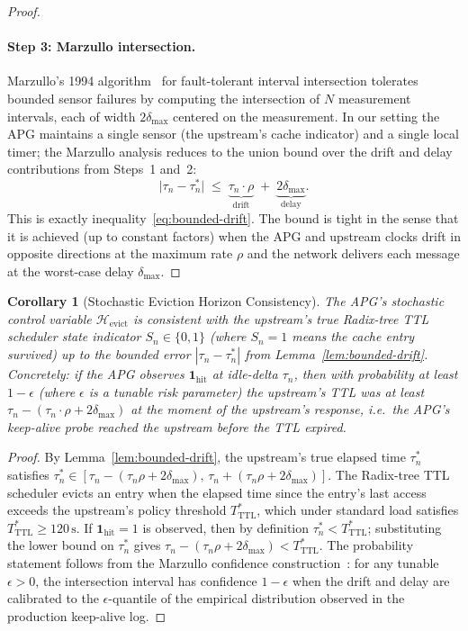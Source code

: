 \documentclass[10pt,twocolumn]{article}
\newtheorem{corollary}[theorem]{Corollary}
\theoremstyle{definition}
\theoremstyle{remark}
\begin{document}
\begin{proof}
\paragraph{Step 3: Marzullo intersection.}
Marzullo's 1994 algorithm~\citep{marzullo1994} for fault-tolerant
interval intersection tolerates bounded sensor failures by computing the
intersection of $N$ measurement intervals, each of width $2 \delta_{\max}$
centered on the measurement. In our setting the APG maintains a single
sensor (the upstream's cache indicator) and a single local timer; the
Marzullo analysis reduces to the union bound over the drift and delay
contributions from Steps~1 and~2:
\begin{equation}
\bigl| \tau_n - \tau_n^* \bigr|
\;\le\; \underbrace{\tau_n \cdot \rho}_{\text{drift}} \;+\;
\underbrace{2 \delta_{\max}}_{\text{delay}}.
\end{equation}
This is exactly inequality~\eqref{eq:bounded-drift}. The bound is
tight in the sense that it is achieved (up to constant factors) when
the APG and upstream clocks drift in opposite directions at the
maximum rate $\rho$ and the network delivers each message at the
worst-case delay $\delta_{\max}$. \qedhere
\end{proof}

\begin{corollary}[Stochastic Eviction Horizon Consistency]
\label{cor:evict-horizon-consistency}
The APG's stochastic control variable $\mathcal{H}_{\text{evict}}$ is
consistent with the upstream's true Radix-tree TTL scheduler state
indicator $S_n \in \{0, 1\}$ (where $S_n = 1$ means the cache entry
survived) up to the bounded error $|\tau_n - \tau_n^*|$ from
Lemma~\ref{lem:bounded-drift}. Concretely: if the APG observes
$\mathbf{1}_{\text{hit}}$ at idle-delta $\tau_n$, then with probability
at least $1 - \epsilon$ (where $\epsilon$ is a tunable risk parameter)
the upstream's TTL was at least
$\tau_n - (\tau_n \cdot \rho + 2 \delta_{\max})$ at the moment of the
upstream's response, i.e.\ the APG's keep-alive probe reached the
upstream before the TTL expired.
\end{corollary}

\begin{proof}
By Lemma~\ref{lem:bounded-drift}, the upstream's true elapsed time
$\tau_n^*$ satisfies
$\tau_n^* \in [\tau_n - (\tau_n \rho + 2 \delta_{\max}),\,
                \tau_n + (\tau_n \rho + 2 \delta_{\max})]$.
The Radix-tree TTL scheduler evicts an entry when the elapsed time
since the entry's last access exceeds the upstream's policy threshold
$T_{\text{TTL}}^*$, which under standard load satisfies
$T_{\text{TTL}}^* \ge 120\,\text{s}$. If $\mathbf{1}_{\text{hit}} = 1$ is
observed, then by definition $\tau_n^* < T_{\text{TTL}}^*$; substituting
the lower bound on $\tau_n^*$ gives
$\tau_n - (\tau_n \rho + 2 \delta_{\max}) < T_{\text{TTL}}^*$. The
probability statement follows from the Marzullo confidence
construction~\citep{marzullo1994}: for any tunable $\epsilon > 0$, the
intersection interval has confidence $1 - \epsilon$ when the drift and
delay are calibrated to the $\epsilon$-quantile of the empirical
distribution observed in the production keep-alive log. \qedhere
\end{proof}
\end{document}
